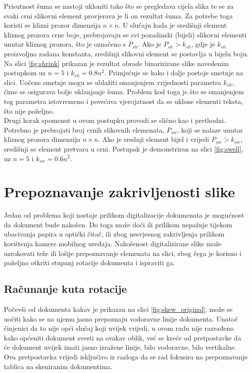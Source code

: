 \documentclass[times, utf8, zavrsni, numeric]{fer}
\begin{document}
Prisutnost šuma se nastoji ukloniti tako što se pregledava cijela slika te se za svaki crni slikovni element provjerava je li on rezultat šuma.
Za potrebe toga koristi se klizni prozor dimenzija $n\times n$.
U slučaju kada je središnji element kliznog prozora crne boje, prebrojavaju se svi pozadinski (bijeli) slikovni elementi unutar kliznog prozora, što je označeno s $P_{sh}$.
Ako je $P_{sh} > k_{sh}$, gdje je $k_{sh}$ proizvoljno zadana konstanta, središnji slikovni element se postavlja u bijelu boju.
Na slici \ref{fig:shrink} prikazan je rezultat obrade binarizirane slike navedenim postupkom uz $n = 5$ i $k_{sh} = 0.8n^2$.
Primjećuje se kako i dalje postoje smetnje na slici.
Uočene smetnje mogu se ublažiti smanjenjem vrijednosti parametra $k_{sh}$, čime se osigurava bolje uklanjanje šuma.
Problem kod toga je što se smanjenjem tog parametra istovremeno i povećava vjerojatnost da se uklone elementi teksta, što nije poželjno.\\

Drugi korak spomenut u ovom postupku provodi se slično kao i prethodni.
Potrebno je prebrojati broj crnih slikovnih elemenata, $P_{sw}$, koji se nalaze unutar kliznog prozora dimenzija $n\times n$.
Ako je srednji element bijel i vrijedi $P_{sw} > k_{sw}$, središnji se element pretvara u crni.
Postupak je demonstriran na slici \ref{fig:swell}, uz $n = 5$ i $k_{sw} = 0.6n^2$.


\chapter{Prepoznavanje zakrivljenosti slike}
\label{ch:skewDetection}
Jedan od problema koji nastaje prilikom digitalizacije dokumenata je mogućnost da dokument bude nakošen. 
Do toga može doći ili prilikom nepažnje tijekom ubacivanja papira u optički čitač, ili zbog nesvjesnog zakrivljenja prilikom korištenja kamere mobilnog uređaja.
Nakošenost digitalizirane slike može uzrokovati teže ili lošije prepoznavanje elemenata na slici, zbog čega je korisno i poželjno otkriti stupanj rotacije dokumenta i ispraviti ga.

\section{Računanje kuta rotacije}
Počevši od dokumenta kakav je prikazan na slici \ref{fig:skew_original}, može se uočiti kako se na njemu jasno prepoznaju vodoravne linije dokumenta.
Unatoč činjenici da to nije opći slučaj koji uvijek vrijedi, u ovom radu nije razrađeno kako općeniti dokument svesti na ovakav oblik, već se kreće od pretpostavke da će dokument uvijek imati jasno izražene linije, bilo vodoravne, bilo vertikalne.
Ova pretpostavka vrijedi isključivo iz razloga da se rad fokusira na prepoznavanje tablica na skeniranim dokumentima.\\
\end{document}
